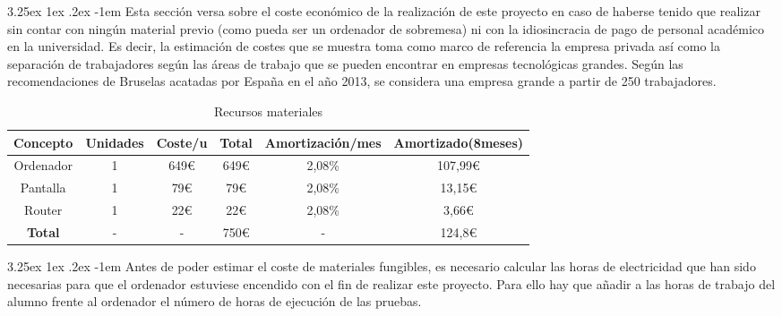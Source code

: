 \documentclass{article}
\makeatletter
\newcounter{subsubsubsection}
\renewcommand\paragraph{\@startsection{paragraph}{5}{\z@}%
      {3.25ex \@plus1ex \@minus.2ex}%
      {-1em}%
      {\normalfont\normalsize\bfseries}}
\makeatother
\begin{document}
    \paragraph{}
    Esta sección versa sobre el coste económico de la realización de este proyecto en caso de haberse tenido que realizar sin contar con ningún material previo (como pueda ser un ordenador de sobremesa) ni con la idiosincracia de pago de personal académico en la universidad. Es decir, la estimación de costes que se muestra toma como marco de referencia la empresa privada así como la separación de trabajadores según las áreas de trabajo que se pueden encontrar en empresas tecnológicas grandes. Según las recomendaciones de Bruselas acatadas por España en el año 2013, se considera una empresa grande a partir de 250 trabajadores\cite{empresaGrande}.
    
    \setcounter{subsubsubsection}{0}
    \begin{table}[H]
    \centering
    \caption{Recursos materiales}
    \begin{tabular}{|c|c|c|c|c|c|}
    \hline
    \textbf{Concepto}      & \textbf{Unidades} & \textbf{Coste/u} & \textbf{Total} & \textbf{Amortización/mes} & \textbf{Amortizado(8meses)} \\ \hline
    Ordenador & 1                           & 649\euro                     & 649\euro                  & 2,08\%                                      & 107,99\euro                                       \\ \hline
    Pantalla & 1                           & 79\euro                      & 79\euro                   & 2,08\%                                      & 13,15\euro                                        \\ \hline
    Router                 & 1                           & 22\euro                      & 22\euro                   & 2,08\%                                      & 3,66\euro                                         \\ \hline
    \textbf{Total}         & -                           & -                       & 750\euro                  & -                                           & 124,8\euro                                        \\ \hline
    \end{tabular}
    \end{table}
    
    \paragraph{}
    Antes de poder estimar el coste de materiales fungibles, es necesario calcular las horas de electricidad que han sido necesarias para que el ordenador estuviese encendido con el fin de realizar este proyecto. Para ello hay que añadir a las horas de trabajo del alumno frente al ordenador el número de horas de ejecución de las pruebas.
    
\end{document}
